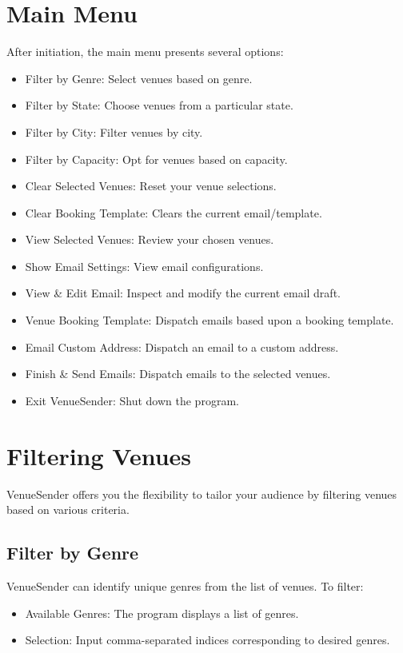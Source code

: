\documentclass{article}
\begin{document}
	\section*{Main Menu}
	After initiation, the main menu presents several options:
	\begin{itemize}
		\item Filter by Genre: Select venues based on genre.
		\item Filter by State: Choose venues from a particular state.
		\item Filter by City: Filter venues by city.
		\item Filter by Capacity: Opt for venues based on capacity.
		\item Clear Selected Venues: Reset your venue selections.
		\item Clear Booking Template: Clears the current email/template.
		\item View Selected Venues: Review your chosen venues.
		\item Show Email Settings: View email configurations.
		\item View \& Edit Email: Inspect and modify the current email draft.
		\item Venue Booking Template: Dispatch emails based upon a booking template.
		\item Email Custom Address: Dispatch an email to a custom address.
		\item Finish \& Send Emails: Dispatch emails to the selected venues.
		\item Exit VenueSender: Shut down the program.
	\end{itemize}
	
	\section*{Filtering Venues}
	VenueSender offers you the flexibility to tailor your audience by filtering venues based on various criteria.
	
	\subsection*{Filter by Genre}
	VenueSender can identify unique genres from the list of venues. To filter:
	\begin{itemize}
		\item Available Genres: The program displays a list of genres.
		\item Selection: Input comma-separated indices corresponding to desired genres.
	\end{itemize}
	
\end{document}
